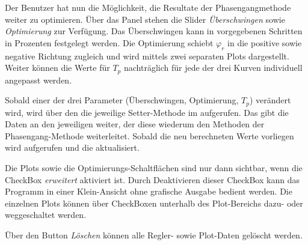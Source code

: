 Der Benutzer  hat nun die  M\"oglichkeit, die Resultate  der Phasengangmethode
weiter  zu  optimieren. \"Uber  das   Panel    stehen  die
Slider  \emph{\"Uberschwingen} sowie  \emph{Optimierung} zur  Verf\"ugung. Das
\"Uberschwingen  kann  in  vorgegebenen   Schritten  in  Prozenten  festgelegt
werden. Die  Optimierung schiebt  $\varphi_r$ in  die positive  sowie negative
Richtung zugleich   und wird mittels zwei  separaten Plots dargestellt. Weiter
k\"onnen  die Werte  f\"ur $T_p$  nachtr\"aglich  f\"ur jede  der drei  Kurven
individuell angepasst werden.

Sobald  einer   der  drei  Parameter  (\"Uberschwingen,   Optimierung,  $T_p$)
ver\"andert  wird,   wird  \"uber   den     die  jeweilige
Setter-Methode im  aufgerufen. Das   gibt die Daten an
den jeweiligen   weiter, der diese wiederum  den Methoden der
Phasengang-Methode  weiterleitet. Sobald die  neu berechneten  Werte vorliegen
wird  aufgerufen und die  aktualisiert.

Die  Plots  sowie die  Optimierungs-Schaltfl\"achen  sind  nur dann  sichtbar,
wenn die  CheckBox \emph{erweitert}  aktiviert ist. Durch  Deaktivieren dieser
CheckBox  kann das  Programm  in einer  Klein-Ansicht  ohne grafische  Ausgabe
bedient werden. Die  einzelnen Plots k\"onnen \"uber  CheckBoxen unterhalb des
Plot-Bereichs dazu- oder weggeschaltet werden.

\"Uber  den Button  \emph{L\"oschen}  k\"onnen alle  Regler- sowie  Plot-Daten
gel\"oscht werden.
